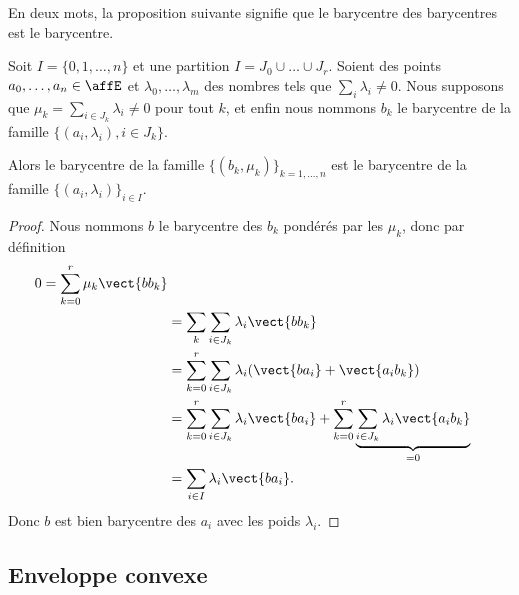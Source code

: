En deux mots, la proposition suivante signifie que le barycentre des barycentres est le barycentre.
\begin{proposition}        \label{PropSFvjFZb}
	Soit \( I=\{ 0,1,\ldots, n \}\) et une partition \( I=J_0\cup\ldots\cup J_r\). Soient des points \( a_0,\ldots, a_n\in \affE\) et \( \lambda_0,\ldots, \lambda_m\) des nombres tels que \( \sum_i\lambda_i\neq 0\). Nous supposons que \( \mu_k=\sum_{i\in J_k}\lambda_i\neq 0\) pour tout \( k\), et enfin nous nommons \( b_k\) le barycentre de la famille \( \{ (a_i,\lambda_i),i\in J_k \}\).

	Alors le barycentre de la famille \( \{ (b_k,\mu_k) \}_{k=1,\ldots, n}\) est le barycentre de la famille \( \{ (a_i,\lambda_i) \}_{i\in I}\).
\end{proposition}

\begin{proof}
	Nous nommons \( b\) le barycentre des \( b_k\) pondérés par les \( \mu_k\), donc par définition
	\begin{subequations}
		\begin{align}
			0=\sum_{k=0}^r\mu_k\vect{ bb_k }                                                                                              \\
			 & =\sum_{k}\sum_{i\in J_k}\lambda_i\vect{ bb_k }                                                                             \\
			 & =\sum_{k=0}^r\sum_{i\in J_k}\lambda_i(\vect{ ba_i }+\vect{ a_ib_k })                                                       \\
			 & =\sum_{k=0}^r\sum_{i\in J_k}\lambda_i\vect{ ba_i }  +\sum_{k=0}^r\underbrace{\sum_{i\in J_k}\lambda_i\vect{ a_ib_k }}_{=0} \\
			 & =\sum_{i\in I}\lambda_i\vect{ ba_i }.
		\end{align}
	\end{subequations}
	Donc \( b\) est bien barycentre des \( a_i\) avec les poids \( \lambda_i\).
\end{proof}

\subsection{Enveloppe convexe}

